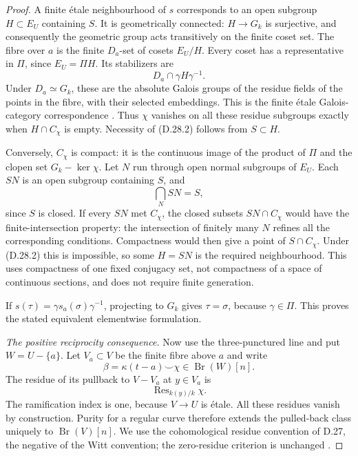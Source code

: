 \begin{proof}
A finite \'etale neighbourhood of $s$ corresponds to an open subgroup
$H\subset E_U$ containing $S$. It is geometrically connected:
$H\to G_k$ is surjective, and consequently the geometric group acts
transitively on the finite coset set. The fibre over $a$ is the finite
$D_a$-set of cosets $E_U/H$. Every coset has a representative in $\Pi$,
since $E_U=\Pi H$. Its stabilizers are
\[
                       D_a\cap\gamma H\gamma^{-1}.
\]
Under $D_a\simeq G_k$, these are the absolute Galois groups of the
residue fields of the points in the fibre, with their selected
embeddings. This is the finite \'etale Galois-category correspondence
\citep[Expos\'e~V]{E_SGA1}. Thus $\chi$ vanishes on all these residue
subgroups exactly when $H\cap C_\chi$ is empty. Necessity of
(D.28.2) follows from $S\subset H$.

Conversely, $C_\chi$ is compact: it is the continuous image of the
product of $\Pi$ and the clopen set $G_k-\ker\chi$. Let $N$ run through
open normal subgroups of $E_U$. Each $SN$ is an open subgroup containing
$S$, and
\[
                              \bigcap_N SN=S,
\]
since $S$ is closed. If every $SN$ met $C_\chi$, the closed subsets
$SN\cap C_\chi$ would have the finite-intersection property: the
intersection of finitely many $N$ refines all the corresponding
conditions. Compactness would then give a point of $S\cap C_\chi$.
Under (D.28.2) this is impossible, so some $H=SN$ is the required
neighbourhood. This uses compactness of one fixed conjugacy set,
not compactness of a space of continuous sections, and does not
require finite generation.

If $s(\tau)=\gamma s_a(\sigma)\gamma^{-1}$, projecting to $G_k$
gives $\tau=\sigma$, because $\gamma\in\Pi$. This proves the
stated equivalent elementwise formulation.

\emph{The positive reciprocity consequence.}
Now use the three-punctured line and put $W=U-\{a\}$. Let
$V_a\subset V$ be the finite fibre above $a$ and write
\[
          \beta=\kappa(t-a)\smile\chi\in\operatorname{Br}(W)[n].
\]
The residue of its pullback to $V-V_a$ at $y\in V_a$ is
\[
                         \operatorname{Res}_{k(y)/k}\chi.
\]
The ramification index is one, because $V\to U$ is \'etale.
All these residues vanish by construction. Purity for a regular curve
therefore extends the pulled-back class uniquely to
$\operatorname{Br}(V)[n]$. We use the cohomological residue convention
of D.27, the negative of the Witt convention; the zero-residue
criterion is unchanged
\citep[\S1.4.1 and Proposition~3.6.1]{D_ColliotTheleneSkorobogatov2019}.


\end{proof}
